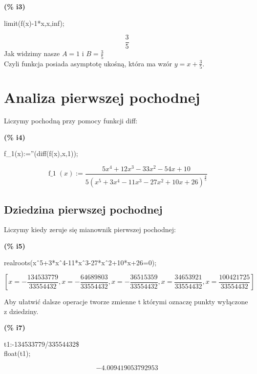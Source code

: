 \documentclass[a4paper]{article}
\begin{document}
\noindent
\begin{minipage}[t]{4.000000em}\color{red}\bfseries
(\% i3)	
\end{minipage}
\begin{minipage}[t]{\textwidth}\color{blue}
limit(f(x)-1*x,x,inf);
\end{minipage}
\[\displaystyle \tag{\% o3} 
\frac{3}{5}\mbox{}
\]
Jak widzimy nasze $A=1$ i $B= \frac{3}{5}$\\
Czyli funkcja posiada asymptotę ukośną, która ma wzór $y = x+\frac{3}{5}$.
\section{Analiza pierwszej pochodnej}
Liczymy pochodną przy pomocy funkcji diff:\\
\noindent
\begin{minipage}[t]{4.000000em}\color{red}\bfseries
(\% i4)	
\end{minipage}
\begin{minipage}[t]{\textwidth}\color{blue}
f\_1(x):=''(diff(f(x),x,1));
\end{minipage}
\[\displaystyle \tag{\% o4} 
\operatorname{f\_ 1}(x)\operatorname{:=}\frac{5 {{x}^{4}}+12 {{x}^{3}}-33 {{x}^{2}}-54 x+10}{5 {{\left( {{x}^{5}}+3 {{x}^{4}}-11 {{x}^{3}}-27 {{x}^{2}}+10 x+26\right) }^{\frac{4}{5}}}}\mbox{}
\]

\subsection{Dziedzina pierwszej pochodnej}
Liczymy kiedy zeruje się mianownik pierwszej pochodnej:


\noindent
\begin{minipage}[t]{4.000000em}\color{red}\bfseries
(\% i5)	
\end{minipage}
\begin{minipage}[t]{\textwidth}\color{blue}
realroots(x\^\ 5+3*x\^\ 4-11*x\^\ 3-27*x\^\ 2+10*x+26=0);
\end{minipage}
\[\displaystyle \tag{\% o5} 
\operatorname{[}x=-\frac{134533779}{33554432}\operatorname{,}x=-\frac{64689803}{33554432}\operatorname{,}x=-
\frac{36515359}{33554432}\operatorname{,}x=\frac{34653921}{33554432}\operatorname{,}x=\frac{100421725}{33554432}\operatorname{]}\mbox{}
\]

Aby ułatwić dalsze operacje tworze zmienne t którymi oznaczę punkty wyłączone z dziedziny.\\ 
\noindent
\begin{minipage}[t]{4.000000em}\color{red}\bfseries
(\% i7)	
\end{minipage}
\begin{minipage}[t]{\textwidth}\color{blue}
t1:-134533779/33554432\$\\
float(t1);
\end{minipage}
\[\displaystyle \tag{\% o7} 
-4.009419053792953\mbox{}
\]
\end{document}
